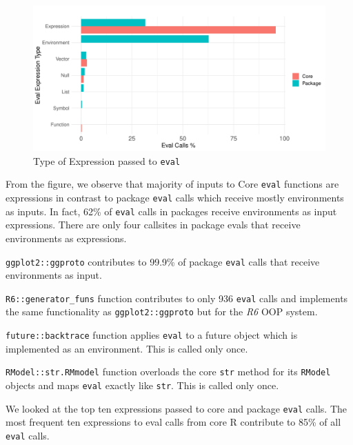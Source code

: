 \documentclass[USenglish,cleveref, autoref, thm-restate]{lipics-v2019}
\newcommand{\PackageEnvironmentInputEvalCallPerc}{62\%\xspace}
\newcommand{\eval}{\texttt{eval}\xspace}
\renewcommand{\c}[1]{\lstinline{#1}\xspace}
\begin{document}
\begin{figure}[!h]
  \centering
  \includegraphics[width=\columnwidth]{eval-expression-kind}
  \caption{Type of Expression passed to \eval} \label{fig:eval-expression-kind}
\end{figure}

From the figure, we observe that majority of inputs to Core \eval functions
are expressions in contrast to package \eval calls which receive mostly
environments as inputs. In fact, \PackageEnvironmentInputEvalCallPerc of
\eval calls in packages receive environments as input expressions. There are
only four callsites in package evals that receive environments as
expressions.
\begin{compactitem}[$-$]
\item \c{ggplot2::ggproto} contributes to 99.9\% of package \eval calls that
  receive environments as input.
\item \c{R6::generator_funs} function contributes to only 936 \eval calls and
implements the same functionality as \c{ggplot2::ggproto} but for the \emph{R6}
OOP system.
\item \c{future::backtrace} function applies \eval to a future object which
  is implemented as an environment. This is called only once.
\item \c{RModel::str.RMmodel} function overloads the core \c{str} method for its
\c{RModel} objects and maps \eval exactly like \c{str}. This is called only
once.
\end{compactitem}

We looked at the top ten expressions passed to core and package \eval
calls. The most frequent ten expressions to eval calls from core R
contribute to 85\% of all \eval calls.
\end{document}
